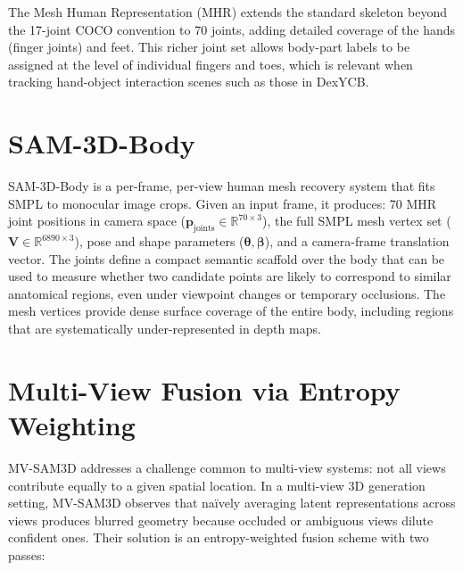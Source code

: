 \documentclass[12pt, a4paper, oneside]{report}
\begin{document}
The Mesh Human Representation (MHR) extends the standard skeleton beyond the 17-joint COCO convention to 70 joints, adding detailed coverage of the hands (finger joints) and feet. This richer joint set allows body-part labels to be assigned at the level of individual fingers and toes, which is relevant when tracking hand-object interaction scenes such as those in DexYCB.

\section{SAM-3D-Body}
\label{sec:sam3d}
SAM-3D-Body \cite{sam3dteam2025sam3d3dfyimages} is a per-frame, per-view human mesh recovery system that fits SMPL to monocular image crops. Given an input frame, it produces: 70 MHR joint positions in camera space ($\mathbf{p}_{\text{joints}} \in \mathbb{R}^{70 \times 3}$), the full SMPL mesh vertex set ($\mathbf{V} \in \mathbb{R}^{6890 \times 3}$), pose and shape parameters ($\boldsymbol{\theta}, \boldsymbol{\beta}$), and a camera-frame translation vector. The joints define a compact semantic scaffold over the body that can be used to measure whether two candidate points are likely to correspond to similar anatomical regions, even under viewpoint changes or temporary occlusions. The mesh vertices provide dense surface coverage of the entire body, including regions that are systematically under-represented in depth maps.

\section{Multi-View Fusion via Entropy Weighting}
\label{sec:mvsam3d}
MV-SAM3D \cite{li2026mvsam3dadaptivemultiviewfusion} addresses a challenge common to multi-view systems: not all views contribute equally to a given spatial location. In a multi-view 3D generation setting, MV-SAM3D observes that na\"ively averaging latent representations across views produces blurred geometry because occluded or ambiguous views dilute confident ones. Their solution is an entropy-weighted fusion scheme with two passes:
\end{document}
